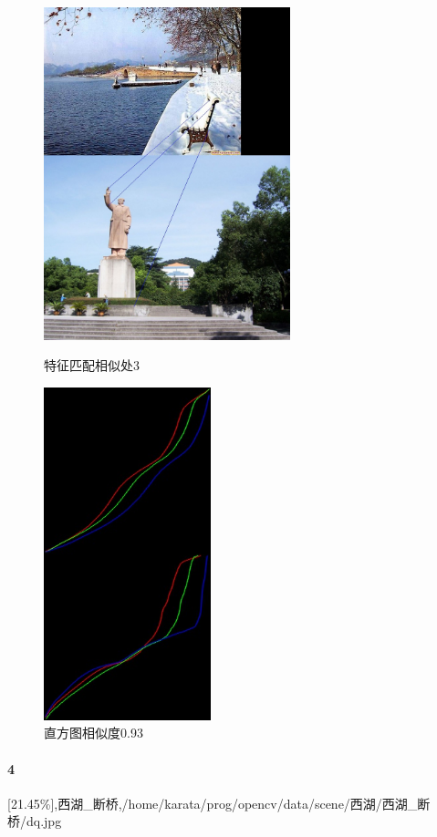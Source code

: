 \begin{figure}[htb]
\begin{minipage}[t]{0.5\linewidth}
\centering
\includegraphics[height=3.8in]{断桥.jpg.d/im3sift.jpg}
\caption{特征匹配相似处3}
\label{fig:side:a}
\end{minipage}%
\begin{minipage}[t]{0.5\linewidth}
\centering
\includegraphics[height=3.8in]{断桥.jpg.d/im3hist2.jpg}
\caption{直方图相似度0.93}
\label{fig:side:a}
\end{minipage}%
\end{figure}

\clearpage
\paragraph{4}
[21.45\%],西湖_断桥,/home/karata/prog/opencv/data/scene/西湖/西湖_断桥/dq.jpg

